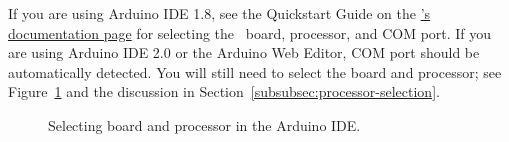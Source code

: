 If you are using Arduino IDE 1.8, see the Quickstart Guide on the \href{https://docs.arduino.cc/hardware/nano}{\developmentboard's documentation page} for selecting the \developmentboard\ board, processor, and COM port.
If you are using Arduino IDE 2.0 or the Arduino Web Editor, COM port should be automatically detected.
You will still need to select the board and processor;
see Figure~\ref{fig:selecting-mcu} and the discussion in Section~\ref{subsubsec:processor-selection}.

\begin{figure}
    \centering
    \hfil

    \caption{Selecting board and processor in the Arduino IDE.
    \label{fig:selecting-mcu}}
\end{figure}


